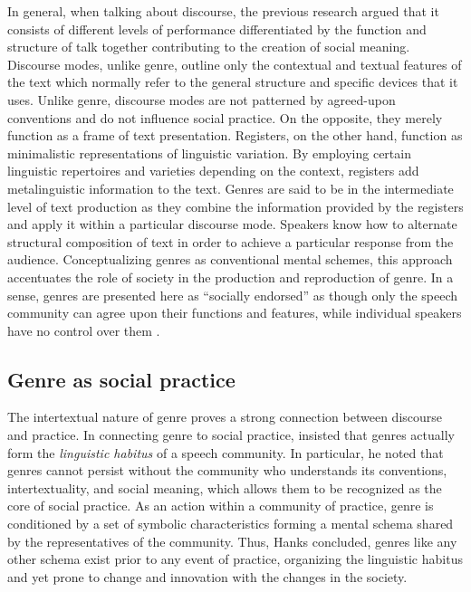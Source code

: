 \documentclass[12pt, draft]{article}
\begin{document}
In general, when talking about discourse, the previous research argued that it consists of different levels of performance differentiated by the function and structure of talk together contributing to the creation of social meaning. Discourse modes, unlike genre, outline only the contextual and textual features of the text which normally refer to the general structure and specific devices that it uses. Unlike genre, discourse modes are not patterned by agreed-upon conventions and do not influence social practice. On the opposite, they merely function as a frame of text presentation. Registers, on the other hand, function as minimalistic representations of linguistic variation. By employing certain linguistic repertoires and varieties depending on the context, registers add metalinguistic information to the text. Genres are said to be in the intermediate level of text production as they combine the information provided by the registers and apply it within a particular discourse mode. Speakers know how to alternate structural composition of text in order to achieve a particular response from the audience. Conceptualizing genres as conventional mental schemes, this approach accentuates the role of society in the production and reproduction of genre. In a sense, genres are presented here as ``socially endorsed'' as though only the speech community can agree upon their functions and features, while individual speakers have no control over them \parencite[p. 60]{bax2011}.  
\subsection{Genre as social practice}
The intertextual nature of genre proves a strong connection between discourse and practice. In connecting genre to social practice, \textcite{hanks1987} insisted that genres actually form the \textit{linguistic habitus} of a speech community. In particular, he noted that genres cannot persist without the community who understands its conventions, intertextuality, and social meaning, which allows them to be recognized as the core of social practice. As an action within a community of practice, genre is conditioned by a set of symbolic characteristics forming a mental schema shared by the representatives of the community. Thus, Hanks concluded, genres like any other schema exist prior to any event of practice, organizing the linguistic habitus and yet prone to change and innovation with the changes in the society.
\end{document}
